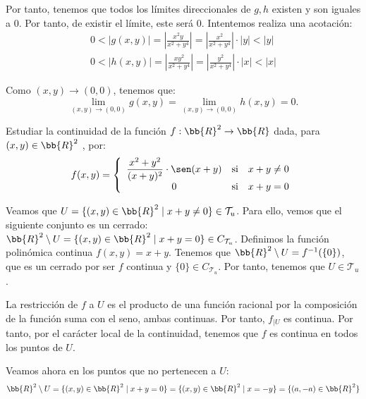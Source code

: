 \begin{ejercicio}
    Por tanto, tenemos que todos los límites direccionales de $g,h$ existen y son iguales a 0. Por tanto, de existir el límite, este será 0. Intentemos realiza una acotación:
    \begin{gather*}
        0 < |g(x,y)|=\left|\frac{x^2y}{x^2+y^4}\right| = \left|\frac{x^2}{x^2+y^4}\right| \cdot |y| < |y| \\
        0 < |h(x,y)|=\left|\frac{xy^2}{x^2+y^4}\right| = \left|\frac{y^2}{x^2+y^4}\right| \cdot |x| < |x|
    \end{gather*}

    Como $(x,y)\to (0,0)$, tenemos que:
    $$\displaystyle \lim_{(x,y)\to (0,0)} g(x,y)=\lim_{(x,y)\to (0,0)} h(x,y)=0.$$
\end{ejercicio}


\begin{ejercicio}
    Estudiar la continuidad de la función $f : \bb{R}^2 \to \bb{R}$ dada, para $(x, y) \in \bb{R}^2$ , por:
    \begin{equation*}
        f(x,y)=
        \left\{\begin{array}{ccc}
            \displaystyle \frac{x^2+y^2}{(x+y)^2}\cdot \sen(x+y) &\text{si}& x+y\neq 0\\
            0 &\text{si}& x+y=0
        \end{array}\right.
    \end{equation*}

    Veamos que $U=\{(x,y)\in \bb{R}^2\mid x+y\neq 0\}\in {\mathcal{T}_u}$. Para ello, vemos que el siguiente conjunto es un cerrado: $\bb{R}^2\setminus U=\{(x,y)\in \bb{R}^2\mid x+y= 0\}\in C_{\mathcal{T}_u}$. Definimos la función polinómica continua $f(x,y)=x+y$. Tenemos que $\bb{R}^2\setminus U=f^{-1}(\{0\})$, que es un cerrado por ser $f$ continua y $\{0\}\in C_{\mathcal{T}_u}$. Por tanto, tenemos que $U\in \mathcal{T}_u$.

    La restricción de $f$ a $U$ es el producto de una función racional por la composición de la función suma con el seno, ambas continuas. Por tanto, $f_{\big| U}$ es continua. Por tanto, por el carácter local de la continuidad, tenemos que $f$ es continua en todos los puntos de $U$.

    Veamos ahora en los puntos que no pertenecen a $U$:
    \begin{equation*}
        \bb{R}^2\setminus U = \{(x,y)\in \bb{R}^2\mid x+y= 0\}=\{(x,y)\in \bb{R}^2\mid x=-y\} = \{(a,-a)\in \bb{R}^2\}
    \end{equation*}


\end{ejercicio}
